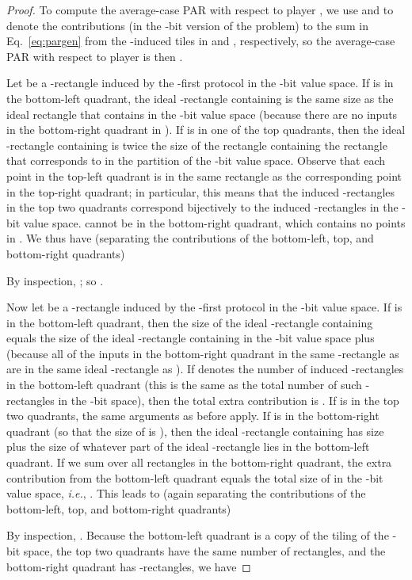 \documentclass{article}
\theoremstyle{theorem}
\theoremstyle{definition}
\theoremstyle{remark}
\newcommand{\ie}{\emph{i.e.}}
\begin{document}
\begin{proof}
To compute the average-case PAR with respect to player , we use  and  to denote the contributions (in the -bit version of the problem) to the sum in Eq.~\ref{eq:pargen} from the -induced tiles in  and , respectively, so the average-case PAR with respect to player  is then .

Let  be a -rectangle induced by the -first protocol in the -bit value space.  If  is in the bottom-left quadrant, the ideal -rectangle containing  is the same size as the ideal rectangle that contains  in the -bit value space (because there are no inputs in the bottom-right quadrant in ).  If  is in one of the top quadrants, then the ideal -rectangle containing  is twice the size of the rectangle containing the rectangle that corresponds to  in the partition of the -bit value space.  Observe that each point in the top-left quadrant is in the same rectangle as the corresponding point in the top-right quadrant; in particular, this means that the induced -rectangles in the top two quadrants correspond bijectively to the induced -rectangles in the -bit value space.   cannot be in the bottom-right quadrant, which contains no points in .  We thus have (separating the contributions of the bottom-left, top, and bottom-right quadrants)

By inspection, ; so .

Now let  be a -rectangle induced by the -first protocol in the -bit value space.  If  is in the bottom-left quadrant, then the size of the ideal -rectangle containing  equals the size of the ideal -rectangle containing  in the -bit value space plus  (because all of the inputs in the bottom-right quadrant in the same -rectangle as  are in the same ideal -rectangle as ).  If  denotes the number of induced -rectangles  in the bottom-left quadrant (this is the same as the total number of such -rectangles in the -bit space), then the total extra contribution is .  If  is in the top two quadrants, the same arguments as before apply.  If  is in the bottom-right quadrant (so that the size of  is ), then the ideal -rectangle containing  has size  plus the size of whatever part of the ideal -rectangle lies in the bottom-left quadrant.  If we sum over all  rectangles  in the bottom-right quadrant, the extra contribution from the bottom-left quadrant equals the total size of  in the -bit value space, \ie, .  This leads to (again separating the contributions of the bottom-left, top, and bottom-right quadrants)

By inspection, .  Because the bottom-left quadrant is a copy of the tiling of the -bit space, the top two quadrants have the same number of rectangles, and the bottom-right quadrant has  -rectangles, we have


\end{proof}
\end{document}
